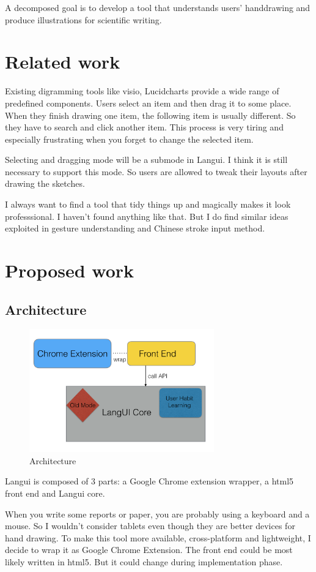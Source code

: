 \documentclass[10pt,conference, twocolumn]{IEEEtran}
\begin{document}
A decomposed goal is to develop a tool that understands users' handdrawing and produce illustrations for scientific writing.


\section{Related work}
Existing digramming tools like visio, Lucidcharts provide a wide range of predefined components. Users select an item and then drag it to some place. When they finish drawing one item, the following item is usually different. So they have to search and click another item. This process is very tiring and especially frustrating when you forget to change the selected item.

Selecting and dragging mode will be a submode in Langui. I think it is still necessary to support this mode. So users are allowed to tweak their layouts after drawing the sketches.

I always want to find a tool that tidy things up and magically makes it look professsional. I haven't found anything like that. But I do find similar ideas exploited in gesture understanding and Chinese stroke input method.


\section{Proposed work}

\subsection{Architecture}
\begin{figure}[H]
\caption{Architecture}
\includegraphics[width=8cm]{5.png}
\end{figure}

Langui is composed of 3 parts: a Google Chrome extension wrapper, a html5 front end and Langui core.

When you write some reports or paper, you are probably using a keyboard and a mouse. So I wouldn't consider tablets even though they are better devices for hand drawing. To make this tool more available,  cross-platform and lightweight, I decide to wrap it as Google Chrome Extension. The front end could be most likely written in html5. But it could change during implementation phase.
\end{document}
